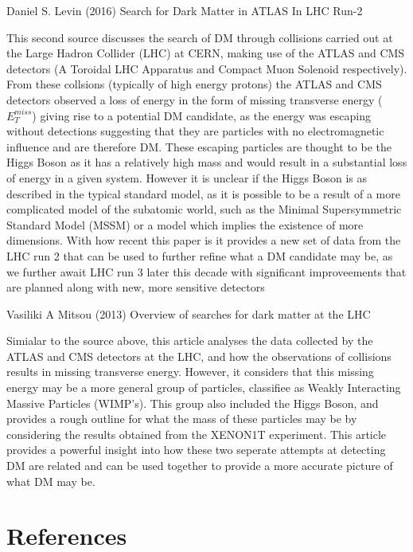 \documentclass[]{article}
\begin{document}
\noindent 
 [2] Daniel S. Levin (2016) Search for Dark Matter in ATLAS In LHC Run-2
\par
This second source discusses the search of DM through collisions carried out at the Large 
Hadron Collider (LHC) at CERN, making use of the ATLAS and CMS detectors 
(A Toroidal LHC Apparatus and Compact Muon Solenoid respectively).
From these collsions (typically of high energy protons) the ATLAS and CMS detectors
observed a loss of energy in the form of missing transverse energy ($E^{miss}_{T} $)
giving rise to a potential DM candidate, as the energy was escaping without 
detections suggesting that they are particles with no electromagnetic influence 
and are therefore DM. These escaping particles are thought to be the Higgs Boson 
as it has a relatively high mass and would result in a substantial loss of energy
in a given system. However it is unclear if the Higgs Boson is as 
described in the typical standard model, as it is possible to be a result of a more 
complicated model of the subatomic world, such as the Minimal Supersymmetric Standard Model (MSSM)
or a model which implies the existence of more dimensions. With how recent this paper 
is it provides a new set of data from the LHC run 2 that can be used to further refine 
what a DM candidate may be, as we further await LHC run 3 later this decade with 
significant improveements that are planned along with new, more sensitive detectors\parskip 0.2cm 

\noindent 
 [5] Vasiliki A Mitsou (2013) Overview of searches for dark matter at the LHC
\par
Simialar to the source above, this article analyses the data collected by the
ATLAS and CMS detectors at the LHC, and how the observations of collisions results in
missing transverse energy. However, it considers that this missing energy may be
a more general group of particles, classifiee as Weakly Interacting Massive Particles (WIMP's).
This group also included the Higgs Boson, and provides a rough outline for what 
the mass of these particles may be by considering the results obtained 
from the XENON1T experiment. This article provides a powerful insight into how these
two seperate attempts at detecting DM are related and can be used together 
to provide a more accurate picture of what DM may be.

\newpage

\section*{References}
\end{document}
